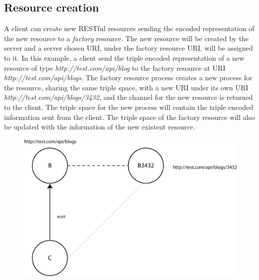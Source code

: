 \subsection{Resource creation}
A client can create new RESTful resources sending the encoded representation of the new resource to a \emph{factory} resource. The new resource will be created by the server and a server chosen URI, under the factory resource URI, will be assigned to it.
In this example, a client send the triple encoded representation of a new resource of type \emph{http://test.com/api/blog} to the factory resource at URI \emph{http://test.com/api/blogs}. The factory resource process creates a new process for the resource, sharing the same triple space, with a new URI under its own URI \emph{http://test.com/api/blogs/3432}, and the channel for the new resource is returned to the client. The triple space for the new process will contain the triple encoded information sent from the client. The triple space of the factory resource will also be updated with the information of the new existent resource.

\begin{figure}[htb!]
\centering%
\includegraphics{post_ex.png}
\end{figure}

